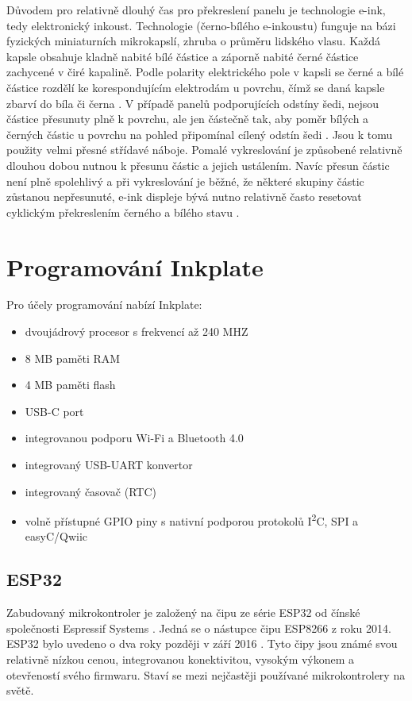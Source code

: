 Důvodem pro relativně dlouhý čas pro překreslení panelu je technologie e-ink, tedy elektronický inkoust. Technologie (černo-bílého e-inkoustu) funguje na bázi fyzických miniaturních mikrokapslí, zhruba o průměru lidského vlasu. Každá kapsle obsahuje kladně nabité bílé částice a záporně nabité černé částice zachycené v čiré kapalině. Podle polarity elektrického pole v kapsli se černé a bílé částice rozdělí ke korespondujícím elektrodám u povrchu, čímž se daná kapsle zbarví do bíla či černa \cite{einkholdingsinc.ElectronicInkInk}. V případě panelů podporujících odstíny šedi, nejsou částice přesunuty plně k povrchu, ale jen částečně tak, aby poměr bílých a černých částic u povrchu na pohled připomínal cílený odstín šedi \cite{adafruitindustriesTHINKINKHow2020}. Jsou k tomu použity velmi přesné střídavé náboje. Pomalé vykreslování je způsobené relativně dlouhou dobou nutnou k přesunu částic a jejich ustálením. Navíc přesun částic není plně spolehlivý a při vykreslování je běžné, že některé skupiny částic zůstanou nepřesunuté, e-ink displeje bývá nutno relativně často resetovat cyklickým překreslením černého a bílého stavu \cite{heikenfeldReviewPaperCritical2011}.

\section{Programování Inkplate}

Pro účely programování nabízí Inkplate:
\begin{itemize}
    \item dvoujádrový procesor s frekvencí až 240 MHZ
    \item 8 MB paměti RAM
    \item 4 MB paměti flash
    \item USB-C port
    \item integrovanou podporu Wi-Fi a Bluetooth 4.0 \cite{solderedelectronicsInkplate102021}
    \item integrovaný USB-UART konvertor
    \item integrovaný časovač (RTC) \cite{solderedelectronicsInkplateFeaturesInkplate}
    \item volně přístupné GPIO piny s nativní podporou protokolů I\textsuperscript{2}C, SPI a easyC/Qwiic
\end{itemize}

\subsection{ESP32}
Zabudovaný mikrokontroler je založený na čipu ze série ESP32 od čínské společnosti Espressif Systems \cite{espressifEspressifEspressifSystems}. Jedná se o nástupce čipu ESP8266 z roku 2014. ESP32 bylo uvedeno o dva roky později v září 2016 \cite{espressifEspressifAnnouncesLaunch}. Tyto čipy jsou známé svou relativně nízkou cenou, integrovanou konektivitou, vysokým výkonem a otevřeností svého firmwaru. Staví se mezi nejčastěji používané mikrokontrolery na světě\cite{espressifEspressifLeadsIoT}\cite{espressifEspressifEspressifSystems}.

